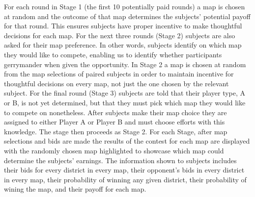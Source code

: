 \documentclass[AER]{AEA}
\begin{document}
  For each round in Stage 1 (the first 10 potentially paid rounds) a map is chosen at random and the outcome of that map determines the subjects' potential payoff for that round. This ensures subjects have proper incentive to make thoughtful decisions for each map. For the next three rounds (Stage 2) subjects are also asked for their map preference. In other words, subjects identify on which map they would like to compete, enabling us to identify whether participants gerrymander when given the opportunity. In Stage 2 a map is chosen at random from the map selections of paired subjects in order to maintain incentive for thoughtful decisions on every map, not just the one chosen by the relevant subject. For the final round (Stage 3) subjects are told that their player type, A or B, is not yet determined, but that they must pick which map they would like to compete on nonetheless. After subjects make their map choice they are assigned to either Player A or Player B and must choose efforts with this knowledge. The stage then proceeds as Stage 2. For each Stage, after map selections and bids are made the results of the contest for each map are displayed with the randomly chosen map highlighted to showcase which map could determine the subjects' earnings. The information shown to subjects includes their bids for every district in every map, their opponent's bids in every district in every map, their probability of winning any given district, their probability of wining the map, and their payoff for each map.
  
\end{document}
